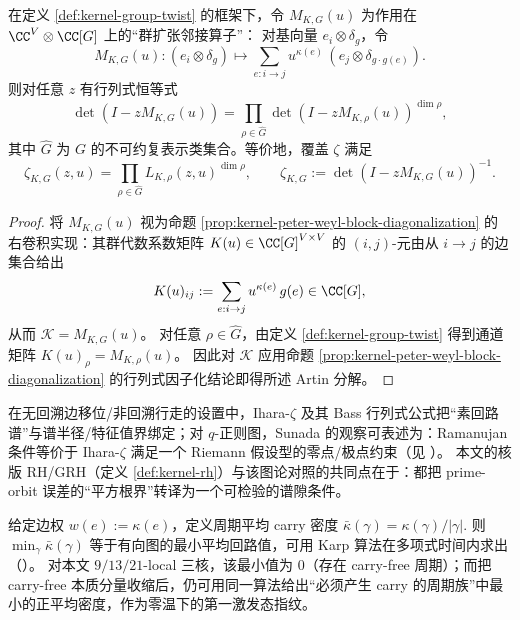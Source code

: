 \begin{proposition}\label{prop:kernel-artin-factorization}
在定义 \ref{def:kernel-group-twist} 的框架下，令 $M_{K,G}(u)$ 为作用在 $\CC^{V}\otimes\CC[G]$ 上的“群扩张邻接算子”：
对基向量 $e_{i}\otimes\delta_g$，令
\[
M_{K,G}(u):(e_i\otimes\delta_g)\mapsto \sum_{e:i\to j}u^{\kappa(e)}\,(e_j\otimes \delta_{g\cdot g(e)}).
\]
则对任意 $z$ 有行列式恒等式
\[
\det(I-zM_{K,G}(u))=\prod_{\rho\in\widehat G}\det(I-zM_{K,\rho}(u))^{\dim\rho},
\]
其中 $\widehat G$ 为 $G$ 的不可约复表示类集合。等价地，覆盖 $\zeta$ 满足
\[
\zeta_{K,G}(z,u)=\prod_{\rho\in\widehat G}L_{K,\rho}(z,u)^{\dim\rho},
\qquad
\zeta_{K,G}:=\det(I-zM_{K,G}(u))^{-1}.
\]
\end{proposition}

\begin{proof}
将 $M_{K,G}(u)$ 视为命题 \ref{prop:kernel-peter-weyl-block-diagonalization} 的右卷积实现：其群代数系数矩阵 \(K(u)\in\CC[G]^{V\times V}\) 的 \((i,j)\)-元由从 \(i\to j\) 的边集合给出
\[
K(u)_{ij}:=\sum_{e:i\to j}u^{\kappa(e)}\,g(e)\in\CC[G],
\]
从而 \(\mathcal{K}=M_{K,G}(u)\)。
对任意 \(\rho\in\widehat G\)，由定义 \ref{def:kernel-group-twist} 得到通道矩阵
\(
K(u)_\rho=M_{K,\rho}(u)
\)。
因此对 \(\mathcal{K}\) 应用命题 \ref{prop:kernel-peter-weyl-block-diagonalization} 的行列式因子化结论即得所述 Artin 分解。
\end{proof}

\begin{remark}\label{rem:kernel-graph-rh}
在无回溯边移位/非回溯行走的设置中，Ihara-\(\zeta\) 及其 Bass 行列式公式把“素回路谱”与谱半径/特征值界绑定；对 $q$-正则图，Sunada 的观察可表述为：Ramanujan 条件等价于 Ihara-\(\zeta\) 满足一个 Riemann 假设型的零点/极点约束（见 \cite{TerrasZetaGraphs,StarkTerras1996GraphCoverings}）。
本文的核版 RH/GRH（定义 \ref{def:kernel-rh}）与该图论对照的共同点在于：都把 prime-orbit 误差的“平方根界”转译为一个可检验的谱隙条件。
\end{remark}

\begin{remark}\label{rem:kernel-min-cycle-mean}
给定边权 $w(e):=\kappa(e)$，定义周期平均 carry 密度
\(
\bar\kappa(\gamma)=\kappa(\gamma)/|\gamma|.
\)
则 $\min_{\gamma}\bar\kappa(\gamma)$ 等于有向图的最小平均回路值，可用 Karp 算法在多项式时间内求出（\cite{Karp1978MinCycleMean}）。
对本文 $9/13/21$-local 三核，该最小值为 $0$（存在 carry-free 周期）；而把 carry-free 本质分量收缩后，仍可用同一算法给出“必须产生 carry 的周期族”中最小的正平均密度，作为零温下的第一激发态指纹。
\end{remark}

